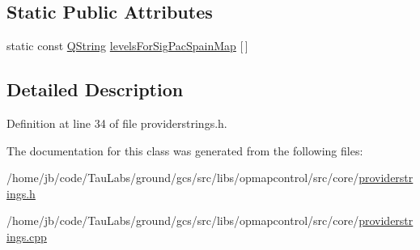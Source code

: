 \subsection*{\-Static \-Public \-Attributes}
\begin{DoxyCompactItemize}
\item 
static const \hyperlink{group___u_a_v_objects_plugin_gab9d252f49c333c94a72f97ce3105a32d}{\-Q\-String} \hyperlink{group___o_p_map_widget_ga8e0c0e07bd5f4a133451306c0603f393}{levels\-For\-Sig\-Pac\-Spain\-Map} \mbox{[}$\,$\mbox{]}
\end{DoxyCompactItemize}


\subsection{\-Detailed \-Description}


\-Definition at line 34 of file providerstrings.\-h.



\-The documentation for this class was generated from the following files\-:\begin{DoxyCompactItemize}
\item 
/home/jb/code/\-Tau\-Labs/ground/gcs/src/libs/opmapcontrol/src/core/\hyperlink{providerstrings_8h}{providerstrings.\-h}\item 
/home/jb/code/\-Tau\-Labs/ground/gcs/src/libs/opmapcontrol/src/core/\hyperlink{providerstrings_8cpp}{providerstrings.\-cpp}\end{DoxyCompactItemize}

